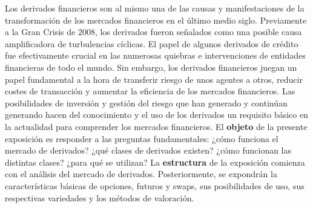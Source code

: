 \documentclass{nuevotema}
\begin{document}
\ideaclave

Los derivados financieros son al mismo una de las causas y manifestaciones de la transformación de los mercados financieros en el último medio siglo. Previamente a la Gran Crisis de 2008, los derivados fueron señalados como una posible causa amplificadora de turbulencias cíclicas. El papel de algunos derivados de crédito fue efectivamente crucial en las numerosas quiebras e intervenciones de entidades financieras de todo el mundo. Sin embargo, los derivados financieros juegan un papel fundamental a la hora de transferir riesgo de unos agentes a otros, reducir costes de transacción y aumentar la eficiencia de los mercados financieros. Las posibilidades de inversión y gestión del riesgo que han generado y continúan generando hacen del conocimiento y el uso de los derivados un requisito básico en la actualidad para comprender los mercados financieros. El \textbf{objeto} de la presente exposición es responder a las preguntas fundamentales: ¿cómo funciona el mercado de derivados? ¿qué clases de derivados existen? ¿cómo funcionan las distintas clases? ¿para qué se utilizan? La \textbf{estructura} de la exposición comienza con el análisis del mercado de derivados. Posteriormente, se expondrán la características básicas de opciones, futuros y swaps, sus posibilidades de uso, sus respectivas variedades y los métodos de valoración.
\end{document}
